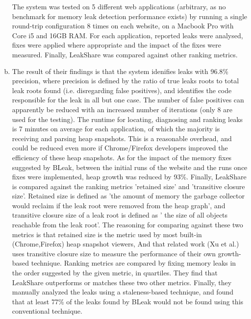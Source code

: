 \documentclass[12pt]{article}
\begin{document}
\begin{enumerate}[(a)]
    The system was tested on 5 different web applications (arbitrary, as no benchmark for memory leak detection performance exists) by running a single round-trip configuration 8 times on each website, on a Macbook Pro with Core i5 and 16GB RAM. For each application, reported leaks were analysed, fixes were applied where appropriate and the impact of the fixes were measured. Finally, LeakShare was compared against other ranking metrics. 

    \item The result of their findings is that the system idenifies leaks with 96.8\% precision, where precision is defined by the ratio of true leaks roots to total leak roots found (i.e. disregarding false positives), and identifies the code responsible for the leak in all but one case. The number of false positives can apparently be reduced with an increased number of iterations (only 8 are used for the testing). The runtime for locating, diagnosing and ranking leaks is 7 minutes on average for each application, of which the majority is receiving and parsing heap snapshots. This is a reasonable overhead, and could be reduced even more if Chrome/Firefox developers improved the efficiency of these heap snapshots. As for the impact of the memory fixes suggested by BLeak, between the initial runs of the website and the runs once fixes were implemented, heap growth was reduced by 93\%. Finally, LeakShare is compared against the ranking metrics 'retained size' and 'transitive closure size'. Retained size is defined as 'the amount of memory the garbage collector
    would reclaim if the leak root were removed from the heap
    graph', and transitive closure size of a leak root is defined as ' the size of all objects reachable from
    the leak root'. The reasoning for comparing against these two metrics is that retained size is the metric used by most built-in (Chrome,Firefox) heap snapshot viewers, And that related work (Xu et al.\supercite{10.1145/2491509.2491511}) uses transitive closure size to measure the performance of their own growth-based technique. Ranking metrics are compared by fixing memory leaks in the order suggested by the given metric, in quartiles. They find that LeakShare outperforms or matches these two other metrics. Finally, they manually analyzed the leaks using a staleness-based technique, and found that at least 77\% of the leaks found by BLeak would not be found using this conventional technique. 
    

\end{enumerate}
\end{document}
